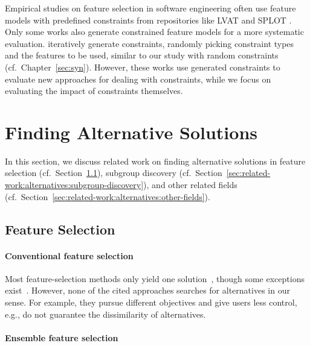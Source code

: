 Empirical studies on feature selection in software engineering often use feature models with predefined constraints from repositories like LVAT \cite{lvat} and SPLOT \cite{mendonca2009splot}.
Only some works also generate constrained feature models for a more systematic evaluation.
\cite{guo2011genetic, ochoa2019constraint, thum2009reasoning} iteratively generate constraints, randomly picking constraint types and the features to be used, similar to our study with random constraints (cf.~Chapter~\ref{sec:syn}).
However, these works use generated constraints to evaluate new approaches for dealing with constraints, while we focus on evaluating the impact of constraints themselves.

\section{Finding Alternative Solutions}
\label{sec:related-work:alternatives}

In this section, we discuss related work on finding alternative solutions in feature selection
(cf.~Section~\ref{sec:related-work:alternatives:feature-selection}), subgroup discovery
(cf.~Section~\ref{sec:related-work:alternatives:subgroup-discovery}), and other related fields
(cf.~Section~\ref{sec:related-work:alternatives:other-fields}).

\subsection{Feature Selection}
\label{sec:related-work:alternatives:feature-selection}

\paragraph{Conventional feature selection}

Most feature-selection methods only yield one solution~\cite{borboudakis2021extending}, though some exceptions exist~\cite{emmanouilidis1999selecting, mueller2021feature, siddiqi2020genetic}.
However, none of the cited approaches searches for alternatives in our sense.
For example, they pursue different objectives and give users less control, e.g., do not guarantee the dissimilarity of alternatives.

\paragraph{Ensemble feature selection}

